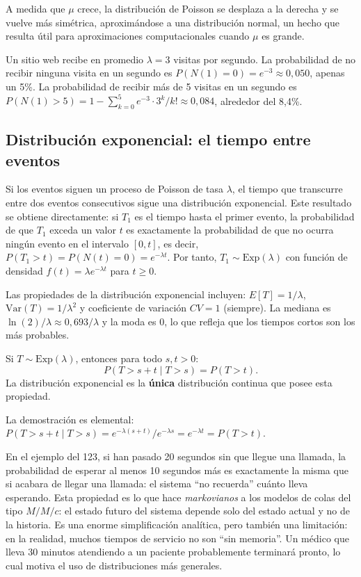 \documentclass[11pt, letterpaper]{article}
\begin{document}
A medida que $\mu$ crece, la distribución de Poisson se desplaza a la derecha y se vuelve más simétrica, aproximándose a una distribución normal, un hecho que resulta útil para aproximaciones computacionales cuando $\mu$ es grande.

\begin{ejemplo}
Un sitio web recibe en promedio $\lambda = 3$ visitas por segundo. La probabilidad de no recibir ninguna visita en un segundo es $P(N(1)=0) = e^{-3} \approx 0{,}050$, apenas un 5\%. La probabilidad de recibir más de 5 visitas en un segundo es $P(N(1)>5) = 1 - \sum_{k=0}^{5} e^{-3}\cdot 3^k/k! \approx 0{,}084$, alrededor del 8{,}4\%.
\end{ejemplo}

\subsection{Distribución exponencial: el tiempo entre eventos}

Si los eventos siguen un proceso de Poisson de tasa $\lambda$, el tiempo que transcurre entre dos eventos consecutivos sigue una distribución exponencial. Este resultado se obtiene directamente: si $T_1$ es el tiempo hasta el primer evento, la probabilidad de que $T_1$ exceda un valor $t$ es exactamente la probabilidad de que no ocurra ningún evento en el intervalo $[0,t]$, es decir, $P(T_1 > t) = P(N(t) = 0) = e^{-\lambda t}$. Por tanto, $T_1 \sim \text{Exp}(\lambda)$ con función de densidad $f(t) = \lambda e^{-\lambda t}$ para $t \geq 0$.

Las propiedades de la distribución exponencial incluyen: $E[T] = 1/\lambda$, $\text{Var}(T) = 1/\lambda^2$ y coeficiente de variación $CV = 1$ (siempre). La mediana es $\ln(2)/\lambda \approx 0{,}693/\lambda$ y la moda es 0, lo que refleja que los tiempos cortos son los más probables.

\begin{teorema}
Si $T \sim \text{Exp}(\lambda)$, entonces para todo $s, t > 0$:
\[
    P(T > s+t \mid T > s) = P(T > t).
\]
La distribución exponencial es la \textbf{única} distribución continua que posee esta propiedad.
\end{teorema}

La demostración es elemental: $P(T > s+t \mid T > s) = e^{-\lambda(s+t)}/e^{-\lambda s} = e^{-\lambda t} = P(T > t)$.

En el ejemplo del 123, si han pasado 20 segundos sin que llegue una llamada, la probabilidad de esperar al menos 10 segundos más es exactamente la misma que si acabara de llegar una llamada: el sistema ``no recuerda'' cuánto lleva esperando. Esta propiedad es lo que hace \emph{markovianos} a los modelos de colas del tipo $M/M/c$: el estado futuro del sistema depende solo del estado actual y no de la historia. Es una enorme simplificación analítica, pero también una limitación: en la realidad, muchos tiempos de servicio no son ``sin memoria''. Un médico que lleva 30 minutos atendiendo a un paciente probablemente terminará pronto, lo cual motiva el uso de distribuciones más generales.
\end{document}
